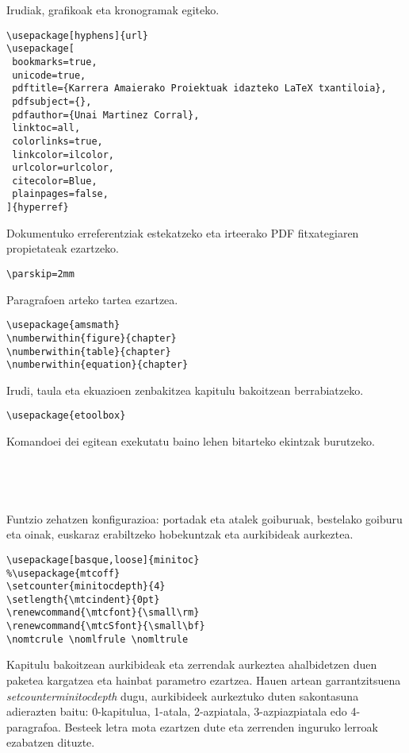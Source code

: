 Irudiak, grafikoak eta kronogramak egiteko.

\begin{verbatim}
\usepackage[hyphens]{url}
\usepackage[
 bookmarks=true,
 unicode=true,
 pdftitle={Karrera Amaierako Proiektuak idazteko LaTeX txantiloia},
 pdfsubject={},
 pdfauthor={Unai Martinez Corral},
 linktoc=all,
 colorlinks=true,
 linkcolor=ilcolor,
 urlcolor=urlcolor,
 citecolor=Blue,
 plainpages=false,
]{hyperref}
\end{verbatim}

Dokumentuko erreferentziak estekatzeko eta irteerako PDF fitxategiaren propietateak ezartzeko.

\begin{verbatim}
\parskip=2mm
\end{verbatim}

Paragrafoen arteko tartea ezartzea.

\begin{verbatim}
\usepackage{amsmath}
\numberwithin{figure}{chapter}
\numberwithin{table}{chapter}
\numberwithin{equation}{chapter}
\end{verbatim}

Irudi, taula eta ekuazioen zenbakitzea kapitulu bakoitzean berrabiatzeko.

\begin{verbatim}
\usepackage{etoolbox}
\end{verbatim}

Komandoei dei egitean exekutatu baino lehen bitarteko ekintzak burutzeko.

\begin{verbatim}




\end{verbatim}

Funtzio zehatzen konfigurazioa: portadak eta atalek goiburuak, bestelako goiburu eta oinak, euskaraz erabiltzeko hobekuntzak eta aurkibideak aurkeztea.

\begin{verbatim}
\usepackage[basque,loose]{minitoc}
%\usepackage{mtcoff}
\setcounter{minitocdepth}{4}
\setlength{\mtcindent}{0pt}
\renewcommand{\mtcfont}{\small\rm}
\renewcommand{\mtcSfont}{\small\bf} 
\nomtcrule \nomlfrule \nomltrule
\end{verbatim}

Kapitulu bakoitzean aurkibideak eta zerrendak aurkeztea ahalbidetzen duen paketea kargatzea eta hainbat parametro ezartzea. Hauen artean garrantzitsuena \emph{setcounter{minitocdepth}} dugu, aurkibideek aurkeztuko duten sakontasuna adierazten baitu: 0-kapitulua, 1-atala, 2-azpiatala, 3-azpiazpiatala edo 4-paragrafoa. Besteek letra mota ezartzen dute eta zerrenden inguruko lerroak ezabatzen dituzte.

